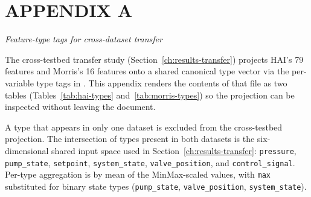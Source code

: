 \chapter*{APPENDIX A}
\label{app:feature-types}
\begin{center}
\textit{Feature-type tags for cross-dataset transfer}
\end{center}
\vspace{0.5cm}

The cross-testbed transfer study (Section~\ref{ch:results-transfer}) projects HAI's 79 features and Morris's 16 features onto a shared canonical type vector via the per-variable type tags in .  This appendix renders the contents of that file as two tables (Tables~\ref{tab:hai-types} and~\ref{tab:morris-types}) so the projection can be inspected without leaving the document.

A type that appears in only one dataset is excluded from the cross-testbed projection.  The intersection of types present in both datasets is the six-dimensional shared input space used in Section~\ref{ch:results-transfer}: \texttt{pressure}, \texttt{pump\_state}, \texttt{setpoint}, \texttt{system\_state}, \texttt{valve\_position}, and \texttt{control\_signal}.  Per-type aggregation is by mean of the MinMax-scaled values, with \texttt{max} substituted for binary state types (\texttt{pump\_state}, \texttt{valve\_position}, \texttt{system\_state}).

